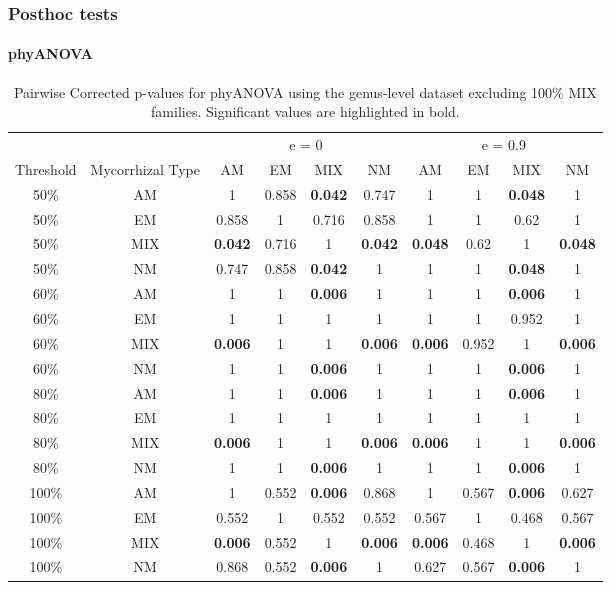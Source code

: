 \documentclass[]{article}
\let\oldparagraph\paragraph
\renewcommand{\paragraph}[1]{\oldparagraph{#1}\mbox{}}
\begin{document}
\hypertarget{posthoc-tests}{%
\subsubsection{Posthoc tests}\label{posthoc-tests}}

\hypertarget{phyanova-5}{%
\paragraph{phyANOVA}\label{phyanova-5}}

\begin{table}[H]

\caption{\label{tab:unnamed-chunk-26}Pairwise Corrected p-values for phyANOVA using the genus-level dataset excluding 100\% MIX families. Significant values are highlighted in bold.}
\centering
\begin{tabular}{c|c|c|c|c|c|c|c|c|c}
\hline
\multicolumn{2}{c|}{ } & \multicolumn{4}{c|}{e = 0} & \multicolumn{4}{c}{e = 0.9} \\
\cline{3-6} \cline{7-10}
Threshold & Mycorrhizal Type & AM & EM & MIX & NM & AM & EM & MIX & NM\\
\hline
50\% & AM & 1 & 0.858 & \textbf{0.042} & 0.747 & 1 & 1 & \textbf{0.048} & 1\\
\hline
50\% & EM & 0.858 & 1 & 0.716 & 0.858 & 1 & 1 & 0.62 & 1\\
\hline
50\% & MIX & \textbf{0.042} & 0.716 & 1 & \textbf{0.042} & \textbf{0.048} & 0.62 & 1 & \textbf{0.048}\\
\hline
50\% & NM & 0.747 & 0.858 & \textbf{0.042} & 1 & 1 & 1 & \textbf{0.048} & 1\\
\hline
60\% & AM & 1 & 1 & \textbf{0.006} & 1 & 1 & 1 & \textbf{0.006} & 1\\
\hline
60\% & EM & 1 & 1 & 1 & 1 & 1 & 1 & 0.952 & 1\\
\hline
60\% & MIX & \textbf{0.006} & 1 & 1 & \textbf{0.006} & \textbf{0.006} & 0.952 & 1 & \textbf{0.006}\\
\hline
60\% & NM & 1 & 1 & \textbf{0.006} & 1 & 1 & 1 & \textbf{0.006} & 1\\
\hline
80\% & AM & 1 & 1 & \textbf{0.006} & 1 & 1 & 1 & \textbf{0.006} & 1\\
\hline
80\% & EM & 1 & 1 & 1 & 1 & 1 & 1 & 1 & 1\\
\hline
80\% & MIX & \textbf{0.006} & 1 & 1 & \textbf{0.006} & \textbf{0.006} & 1 & 1 & \textbf{0.006}\\
\hline
80\% & NM & 1 & 1 & \textbf{0.006} & 1 & 1 & 1 & \textbf{0.006} & 1\\
\hline
100\% & AM & 1 & 0.552 & \textbf{0.006} & 0.868 & 1 & 0.567 & \textbf{0.006} & 0.627\\
\hline
100\% & EM & 0.552 & 1 & 0.552 & 0.552 & 0.567 & 1 & 0.468 & 0.567\\
\hline
100\% & MIX & \textbf{0.006} & 0.552 & 1 & \textbf{0.006} & \textbf{0.006} & 0.468 & 1 & \textbf{0.006}\\
\hline
100\% & NM & 0.868 & 0.552 & \textbf{0.006} & 1 & 0.627 & 0.567 & \textbf{0.006} & 1\\
\hline
\end{tabular}
\end{table}
\end{document}
